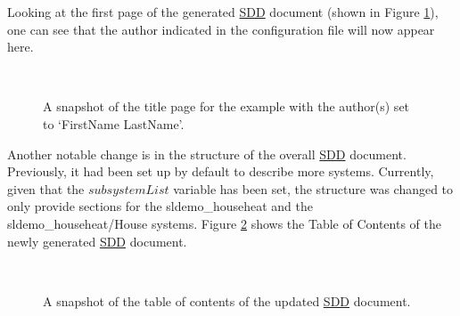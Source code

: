 \documentclass{mcscert}
\begin{document}
Looking at the first page of the generated \hyperref[acr:sdd]{SDD} document (shown in Figure \ref{fig:title-page-2}), one can see that the author indicated in the
configuration file will now appear here.

\begin{figure}
	\caption{A snapshot of the title page for the example with the author(s) set to	`FirstName LastName'.}
	\centering
	\label{fig:title-page-2}
	\\
\end{figure}

Another notable change is in the structure of the overall \hyperref[acr:sdd]{SDD} document. 
Previously, it had been set up by default to describe more systems. 
Currently, given that the $subsystemList$ variable has been set, the structure was changed to only provide sections for the sldemo\_househeat and the sldemo\_househeat/House systems. 
Figure \ref{fig:toc-2} shows the Table of Contents of the newly generated \hyperref[acr:sdd]{SDD} document.

\begin{figure}
	\caption{A snapshot of the table of contents of the updated \hyperref[acr:sdd]{SDD} document.}
	\centering
	\label{fig:toc-2}
	\\
\end{figure}
\end{document}
